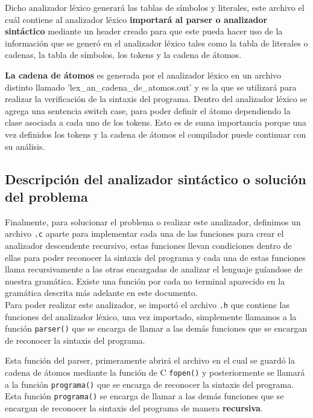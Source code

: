 \documentclass[12pt, a4paper]{article}
\begin{document}
Dicho analizador léxico generará las tablas de símbolos y literales, este archivo el cuál contiene al analizador léxico \textbf{importará al parser o analizador sintáctico } mediante un header creado para que este pueda hacer uso de la información que se generó en el analizador léxico tales como la tabla de literales o cadenas, la tabla de símbolos, los tokens y la cadena de átomos.

\textbf{La cadena de átomos} es generada por el analizador léxico en un archivo distinto llamado 'lex\_an\_cadena\_de\_atomos.out' y es la que se utilizará para realizar la verificación de la sintaxis del programa. Dentro del analizador léxico se agrega una sentencia switch case, para poder definir el átomo dependiendo la clase asociada a cada uno de los tokens. Esto es de suma importancia porque una vez definidos los tokens y la cadena de átomos el compilador puede continuar con su análisis.

\subsection{Descripción del analizador sintáctico o solución del problema}

Finalmente, para solucionar el problema o realizar este analizador, definimos un archivo \texttt{.c} aparte para implementar cada una de las funciones para crear el analizador descendente recursivo, estas funciones llevan condiciones dentro de ellas para poder reconocer la sintaxis del programa y cada una de estas funciones llama recursivamente a las otras encargadas de analizar el lenguaje guíandose de nuestra gramática. Existe una función por cada no terminal aparecido en la gramática descrita más adelante en este documento. \\
Para poder realizar este analizador, se importó el archivo \texttt{.h} que contiene las funciones del analizador léxico, una vez importado, simplemente llamamos a la función \texttt{parser()} que se encarga de llamar a las demás funciones que se encargan de reconocer la sintaxis del programa. 

Esta función del parser, primeramente abrirá el archivo en el cual se guardó la cadena de átomos mediante la función de C \texttt{fopen()} y posteriormente se llamará a la función \texttt{programa()} que se encarga de reconocer la sintaxis del programa. Esta función \texttt{programa()} se encarga de llamar a las demás funciones que se encargan de reconocer la sintaxis del programa de manera \textbf{recursiva}.
\end{document}
